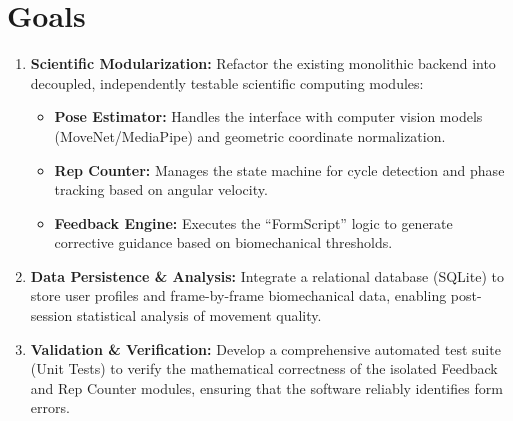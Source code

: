 \documentclass{article}
\begin{document}
\section{Goals}
\begin{enumerate}
    \item \textbf{Scientific Modularization:} Refactor the existing monolithic backend into decoupled, independently testable scientific computing modules:
    \begin{itemize}
        \item \textbf{Pose Estimator:} Handles the interface with computer vision models (MoveNet/MediaPipe) and geometric coordinate normalization.
        \item \textbf{Rep Counter:} Manages the state machine for cycle detection and phase tracking based on angular velocity.
        \item \textbf{Feedback Engine:} Executes the ``FormScript'' logic to generate corrective guidance based on biomechanical thresholds.
    \end{itemize}
    \item \textbf{Data Persistence \& Analysis:} Integrate a relational database (SQLite) to store user profiles and frame-by-frame biomechanical data, enabling post-session statistical analysis of movement quality.
    \item \textbf{Validation \& Verification:} Develop a comprehensive automated test suite (Unit Tests) to verify the mathematical correctness of the isolated Feedback and Rep Counter modules, ensuring that the software reliably identifies form errors.
\end{enumerate}
\end{document}
